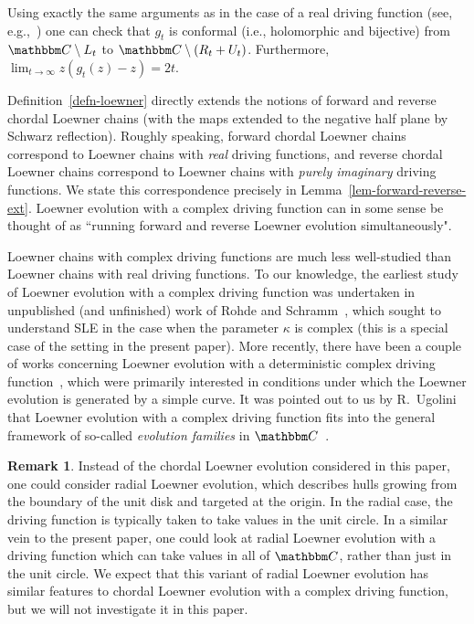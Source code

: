 \documentclass[11pt]{article}
\theoremstyle{plain}
\theoremstyle{definition}
\newtheorem{remark}[thm]{Remark}
\numberwithin{equation}{section}
\newcommand{\BB}{\mathbbm}
\newcommand{\rta}{\rightarrow}
\begin{document}
Using exactly the same arguments as in the case of a real driving function (see, e.g.,~\cite[Theorem 4.5]{lawler-book}) one can check that $g_t$ is conformal (i.e., holomorphic and bijective) from $\BB C\setminus L_t$ to $\BB C\setminus (R_t + U_t)$. Furthermore, $\lim_{t\rta\infty} z(g_t(z) - z) = 2t$. 

Definition~\ref{defn-loewner} directly extends the notions of forward and reverse chordal Loewner chains (with the maps extended to the negative half plane by Schwarz reflection). Roughly speaking, forward chordal Loewner chains correspond to Loewner chains with \emph{real} driving functions, and reverse chordal Loewner chains correspond to Loewner chains with \emph{purely imaginary} driving functions. We state this correspondence precisely in Lemma~\ref{lem-forward-reverse-ext}.
Loewner evolution with a complex driving function can in some sense be thought of as ``running forward and reverse Loewner evolution simultaneously". 
 
Loewner chains with complex driving functions are much less well-studied than Loewner chains with real driving functions. 
To our knowledge, the earliest study of Loewner evolution with a complex driving function was undertaken in unpublished (and unfinished) work of Rohde and Schramm~\cite{rs-complex-sle}, which sought to understand SLE in the case when the parameter $\kappa$ is complex (this is a special case of the setting in the present paper).
More recently, there have been a couple of works concerning Loewner evolution with a deterministic complex driving function~\cite{tran-complex-loewner,lu-complex-loewner}, which were primarily interested in conditions under which the Loewner evolution is generated by a simple curve. It was pointed out to us by R.\ Ugolini that Loewner evolution with a complex driving function fits into the general framework of so-called \emph{evolution families} in $\BB C$~\cite{bcd-evolution-families1}. 

\begin{remark} \label{remark-radial}
Instead of the chordal Loewner evolution considered in this paper, one could consider radial Loewner evolution, which describes hulls growing from the boundary of the unit disk and targeted at the origin. In the radial case, the driving function is typically taken to take values in the unit circle. In a similar vein to the present paper, one could look at radial Loewner evolution with a driving function which can take values in all of $\BB C$, rather than just in the unit circle. We expect that this variant of radial Loewner evolution has similar features to chordal Loewner evolution with a complex driving function, but we will not investigate it in this paper.
\end{remark}
 
\end{document}
